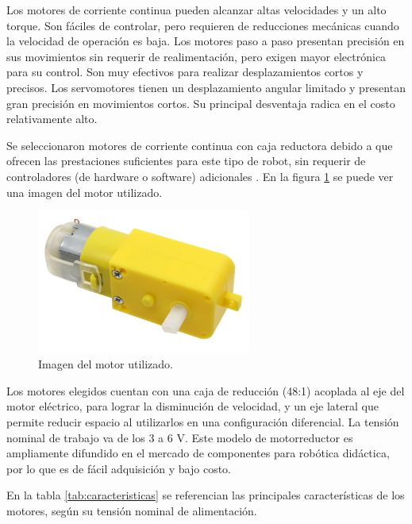 Los motores de corriente continua pueden alcanzar altas velocidades y un alto torque. Son fáciles de controlar, pero requieren de reducciones mecánicas cuando la velocidad de operación es baja.
Los motores paso a paso presentan precisión en sus movimientos sin requerir de realimentación,  pero exigen mayor electrónica para su control. Son muy efectivos para realizar desplazamientos cortos y precisos. Los servomotores  tienen un desplazamiento angular limitado y presentan gran precisión en movimientos cortos. Su principal  desventaja radica en el costo relativamente alto.

Se seleccionaron motores de corriente continua con caja reductora debido a que ofrecen las prestaciones suficientes para este tipo de robot, sin requerir de controladores (de hardware o software) adicionales \citep{motorcc}. 
En la figura \ref{fig:motorreductor} se puede ver una imagen del motor utilizado.

\begin{figure}[h]
	\centering
	\includegraphics[width=7cm]{./Figures/Motorreductor.jpg}
	\caption{Imagen del motor utilizado\protect\footnotemark.}
	\label{fig:motorreductor}
\end{figure}

Los motores elegidos cuentan con una caja de reducción (48:1) acoplada al eje del motor eléctrico, para lograr la disminución de velocidad, y un eje lateral que permite reducir espacio al utilizarlos en una configuración diferencial. La tensión nominal de trabajo va de los  3 a 6 V. Este modelo de motorreductor es ampliamente difundido en el mercado de componentes para robótica didáctica, por lo que es de fácil adquisición y bajo costo. 

En la tabla \ref{tab:caracteristicas} se referencian las principales características de los motores, según su tensión nominal de alimentación. 

